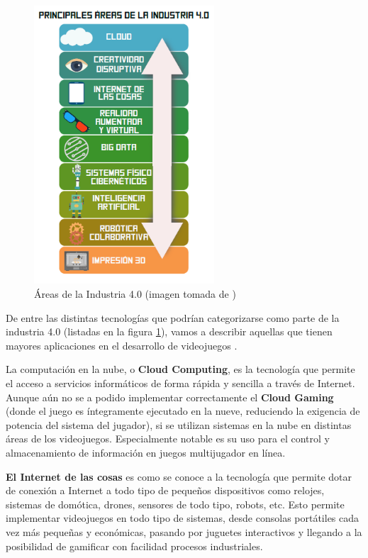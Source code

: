\begin{figure}[h]
    \centering
    \includegraphics[width=0.6\textwidth]{images/estadodelarte/mercado/tabla-web-4}
    \caption{Áreas de la Industria 4.0 (imagen tomada de \cite{libro_blanco})}
    \label{tabla-web-4}
\end{figure}

De entre las distintas tecnologías que podrían categorizarse como parte de la industria 4.0 (listadas en la figura \ref{tabla-web-4}), vamos a describir aquellas que tienen mayores aplicaciones en el desarrollo de videojuegos \cite{libro_blanco}.

La computación en la nube, o \textbf{Cloud Computing}, es la tecnología que permite el acceso a servicios informáticos de forma rápida y sencilla a través de Internet. Aunque aún no se a podido implementar correctamente el \textbf{Cloud Gaming} (donde el juego es íntegramente ejecutado en la nueve, reduciendo la exigencia de potencia del sistema del jugador), si se utilizan sistemas en la nube en distintas áreas de los videojuegos. Especialmente notable es su uso para el control y almacenamiento de información en juegos multijugador en línea.

\textbf{El Internet de las cosas} es como se conoce a la tecnología que permite dotar de conexión a Internet a todo tipo de pequeños dispositivos como relojes, sistemas de domótica, drones, sensores de todo tipo, robots, etc. Esto permite implementar videojuegos en todo tipo de sistemas, desde consolas portátiles cada vez más pequeñas y económicas, pasando por juguetes interactivos y llegando a la posibilidad de gamificar con facilidad procesos industriales.

